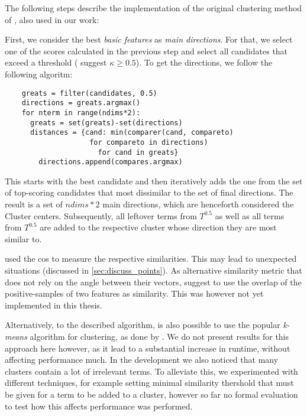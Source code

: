 The following steps describe the implementation of the original clustering method of \textcite{Derrac2015}, also used in our work:

First, we consider the best \textit{basic features} as \textit{main directions}. For that, we select one of the scores calculated in the previous step and select all candidates that exceed a threshold (\cite{Derrac2015} suggest $\kappa \geq 0.5$).
To get the directions, we follow the following algoritm:

\vspace{-1.3ex}
\begingroup
\verbatimfont{\footnotesize}%
\begin{verbatim}
	greats = filter(candidates, 0.5)
	directions = greats.argmax()
	for nterm in range(ndims*2):
	  greats = set(greats)-set(directions)
	  distances = {cand: min(comparer(cand, compareto) 
	                for compareto in directions) 
	                  for cand in greats}
		directions.append(compares.argmax)
\end{verbatim}
\endgroup
\vspace{-1.2ex}

This starts with the best candidate and then iteratively adds the one from the set of top-scoring candidates that most dissimilar to the set of final directions. The result is a set of $ndims*2$ main directions, which are henceforth considered the Cluster centers. Subsequently, all leftover terms from $T^{0.5}$ as well as all terms from $T^{0.5}$ are added to the respective cluster whose direction they are most similar to. 

\textcite{Derrac2015} used the \gls{cos} to measure the respective similarities. This may lead to unexpected situations (discussed in \autoref{sec:discuss_points}). As alternative similarity metric that does not rely on the angle between their vectors, \cite{Alshaikh2019} suggest to use the overlap of the positive-samples of two features as similarity. This was however not yet implemented in this thesis.

Alternatively, to the described algorithm, is also possible to use the popular \textit{k-means} algorithm for clustering, as done by \cite{Ager2018}. We do not present results for this approach here however, as it lead to a substantial increase in runtime, without affecting performance much. In the development we also noticed that many clusters contain a lot of irrelevant terms. To alleviate this, we experimented with different techniques, for example setting minimal similarity thershold that must be given for a term to be added to a cluster, however so far no formal evaluation to test how this affects performance was performed.


